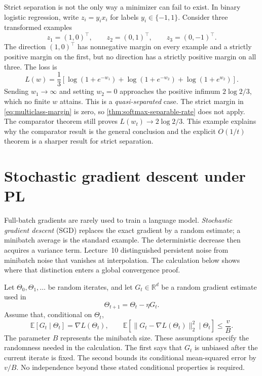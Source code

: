 \documentclass[11pt,twoside]{article}
\newcommand{\E}{\mathbb E}
\newcommand{\R}{\mathbb R}
\theoremstyle{definition}
\theoremstyle{remark}
\begin{document}
Strict separation is not the only way a minimizer can fail to exist. In binary
logistic regression, write $z_i=y_ix_i$ for labels $y_i\in\{-1,1\}$. Consider
three transformed examples
\[
 z_1=(1,0)^\top,
 \qquad z_2=(0,1)^\top,
 \qquad z_3=(0,-1)^\top.
\]
The direction $(1,0)^\top$ has nonnegative margin on every example and a
strictly positive margin on the first, but no direction has a strictly
positive margin on all three. The loss is
\begin{equation}
 L(w)=\frac13\left[
 \log(1+e^{-w_1})+\log(1+e^{-w_2})+\log(1+e^{w_2})
 \right].
 \label{eq:quasi-separated-example}
\end{equation}
Sending $w_1\to\infty$ and setting $w_2=0$ approaches the positive infimum
$2\log2/3$, which no finite $w$ attains. This is a \emph{quasi-separated}
case. The
strict margin in \cref{eq:multiclass-margin} is zero, so
\cref{thm:softmax-separable-rate} does not apply. The comparator theorem still
proves $L(w_t)\to2\log2/3$. This example explains why the comparator result is
the general conclusion and the explicit $O(1/t)$ theorem is a sharper result
for strict separation.

\section{Stochastic gradient descent under PL}
\label{sec:stochastic-pl}

Full-batch gradients are rarely used to train a language model. \emph{Stochastic
gradient descent} (SGD) replaces the exact gradient by a random estimate; a
minibatch average is the standard example. The deterministic decrease then
acquires a variance term. Lecture~10 distinguished persistent noise from
minibatch noise that vanishes at interpolation. The calculation below shows
where that distinction enters a global convergence proof.

Let $\Theta_0,\Theta_1,\ldots$ be random iterates, and let $G_t\in\R^d$ be a
random gradient estimate used in
\begin{equation}
 \Theta_{t+1}=\Theta_t-\eta G_t.
 \label{eq:stochastic-update}
\end{equation}
Assume that, conditional on $\Theta_t$,
\begin{equation}
 \E[G_t\mid\Theta_t]=\nabla L(\Theta_t),
 \qquad
 \E\!\left[\|G_t-\nabla L(\Theta_t)\|_2^2
             \mid\Theta_t\right]\le\frac vB.
 \label{eq:stochastic-assumptions}
\end{equation}
The parameter $B$ represents the minibatch size. These assumptions specify
the randomness needed in the calculation. The first says that $G_t$ is
unbiased after the current iterate is fixed. The second bounds its conditional
mean-squared error by $v/B$. No independence beyond these stated conditional
properties is required.
\end{document}
